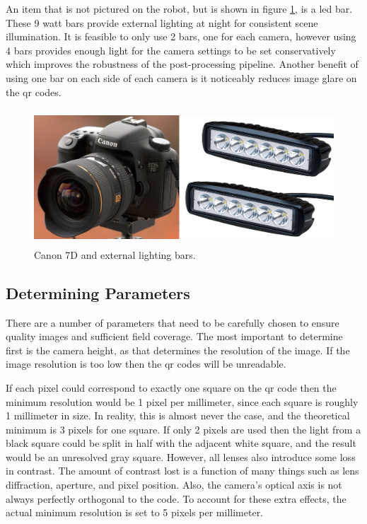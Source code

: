 An item that is not pictured on the robot, but is shown in figure \ref{figure:canon_and_bars}, is a \ac{led} bar.  These 9 watt bars provide external lighting at night for consistent scene illumination.  It is feasible to only use 2 bars, one for each camera, however using 4 bars provides enough light for the camera settings to be set conservatively which improves the robustness of the post-processing pipeline.  Another benefit of using one bar on each side of each camera is it noticeably reduces image glare on the \ac{qr} codes.  

\begin{figure}
	\centering
    \includegraphics[height=2in]{figures/canon7d_and_LEDs.jpg}
    \caption[Canon 7D and LED bars]{Canon 7D and external lighting bars.}
    \label{figure:canon_and_bars}
\end{figure}

\subsection{Determining Parameters}
\label{section:determining_parameters}

There are a number of parameters that need to be carefully chosen to ensure quality images and sufficient field coverage.  The most important to determine first is the camera height, as that determines the resolution of the image.  If the image resolution is too low then the \ac{qr} codes will be unreadable.  

If each pixel could correspond to exactly one square on the \ac{qr} code then the minimum resolution would be 1 pixel per millimeter, since each square is roughly 1 millimeter in size.  In reality, this is almost never the case, and the theoretical minimum is 3 pixels for one square.  If only 2 pixels are used then the light from a black square could be split in half with the adjacent white square, and the result would be an unresolved gray square.  However, all lenses also introduce some loss in contrast.  The amount of contrast lost is a function of many things such as lens diffraction, aperture, and pixel position.  Also, the camera's optical axis is not always perfectly orthogonal to the code.  To account for these extra effects, the actual minimum resolution is set to 5 pixels per millimeter.  

